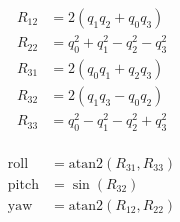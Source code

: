 \begin{minipage}[H]{0.5\textwidth}
    \vspace{0pt}
    \begin{align*}
        R_{12} &= 2(q_1q_2+q_0q_3) \\
        R_{22} &= q_0^2+q_1^2-q_2^2-q_3^2 \\
        R_{31} &= 2(q_0q_1+q_2q_3) \\
        R_{32} &= 2(q_1q_3-q_0q_2) \\
        R_{33} &= q_0^2-q_1^2-q_2^2+q_3^2 \\
    \end{align*}
\end{minipage}%
\begin{minipage}[H]{0.5\textwidth}
    \vspace{0pt}
    \begin{align*}
        \text{roll}  &= \mathrm{atan2}(R_{31},R_{33}) \\
        \text{pitch} &= \sin(R_{32}) \\
        \text{yaw}   &= \mathrm{atan2}(R_{12},R_{22}) \\
    \end{align*}
\end{minipage}

